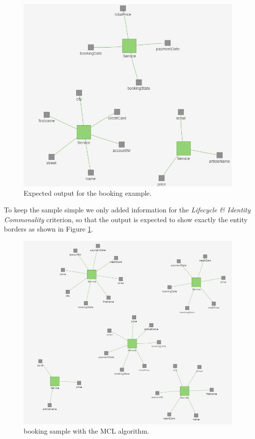 \begin{figure}[H]
	\begin{center}
		\includegraphics[scale=0.75]{images/booking_entities.png}
	\end{center}
	\caption{Expected output for the booking example.}
	\label{fig:bookingExample}
\end{figure}

To keep the sample simple we only added information for the \textit{Lifecycle \& Identity Commonality} criterion, so that the output is expected to show exactly the entity borders as shown in Figure \ref{fig:bookingExample}.


\begin{figure}[H]
	\begin{center}
		\includegraphics[scale=0.7]{images/booking_entities_mcl.png}
	\end{center}
	\caption{booking sample with the MCL algorithm.}
	\label{fig:bookingExampleMCL}
\end{figure}

